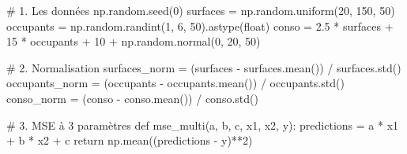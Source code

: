 \documentclass[
  french,
  11pt,
  a4paper,
]{scrbook}
\newenvironment{Shaded}{}{}
\newcommand{\BuiltInTok}[1]{\textcolor[rgb]{0.84,0.23,0.29}{#1}}
\newcommand{\CommentTok}[1]{\textcolor[rgb]{0.42,0.45,0.49}{#1}}
\newcommand{\ControlFlowTok}[1]{\textcolor[rgb]{0.84,0.23,0.29}{#1}}
\newcommand{\DecValTok}[1]{\textcolor[rgb]{0.00,0.36,0.77}{#1}}
\newcommand{\FloatTok}[1]{\textcolor[rgb]{0.00,0.36,0.77}{#1}}
\newcommand{\KeywordTok}[1]{\textcolor[rgb]{0.84,0.23,0.29}{#1}}
\newcommand{\NormalTok}[1]{\textcolor[rgb]{0.14,0.16,0.18}{#1}}
\newcommand{\OperatorTok}[1]{\textcolor[rgb]{0.14,0.16,0.18}{#1}}
\begin{document}
\begin{tcolorbox}[enhanced jigsaw, arc=.35mm, bottomrule=.15mm, bottomtitle=1mm, breakable, colback=white, colbacktitle=quarto-callout-tip-color!10!white, colframe=quarto-callout-tip-color-frame, coltitle=black, left=2mm, leftrule=.75mm, opacityback=0, opacitybacktitle=0.6, rightrule=.15mm, title=\textcolor{quarto-callout-tip-color}{\faLightbulb}\hspace{0.5em}{✅ Voir la correction}, titlerule=0mm, toprule=.15mm, toptitle=1mm]

\begin{Shaded}
\begin{Highlighting}[]
\CommentTok{\# 1. Les données}
\NormalTok{np.random.seed(}\DecValTok{0}\NormalTok{)}
\NormalTok{surfaces }\OperatorTok{=}\NormalTok{ np.random.uniform(}\DecValTok{20}\NormalTok{, }\DecValTok{150}\NormalTok{, }\DecValTok{50}\NormalTok{)}
\NormalTok{occupants }\OperatorTok{=}\NormalTok{ np.random.randint(}\DecValTok{1}\NormalTok{, }\DecValTok{6}\NormalTok{, }\DecValTok{50}\NormalTok{).astype(}\BuiltInTok{float}\NormalTok{)}
\NormalTok{conso }\OperatorTok{=} \FloatTok{2.5} \OperatorTok{*}\NormalTok{ surfaces }\OperatorTok{+} \DecValTok{15} \OperatorTok{*}\NormalTok{ occupants }\OperatorTok{+} \DecValTok{10} \OperatorTok{+}\NormalTok{ np.random.normal(}\DecValTok{0}\NormalTok{, }\DecValTok{20}\NormalTok{, }\DecValTok{50}\NormalTok{)}

\CommentTok{\# 2. Normalisation}
\NormalTok{surfaces\_norm }\OperatorTok{=}\NormalTok{ (surfaces }\OperatorTok{{-}}\NormalTok{ surfaces.mean()) }\OperatorTok{/}\NormalTok{ surfaces.std()}
\NormalTok{occupants\_norm }\OperatorTok{=}\NormalTok{ (occupants }\OperatorTok{{-}}\NormalTok{ occupants.mean()) }\OperatorTok{/}\NormalTok{ occupants.std()}
\NormalTok{conso\_norm }\OperatorTok{=}\NormalTok{ (conso }\OperatorTok{{-}}\NormalTok{ conso.mean()) }\OperatorTok{/}\NormalTok{ conso.std()}

\CommentTok{\# 3. MSE à 3 paramètres}
\KeywordTok{def}\NormalTok{ mse\_multi(a, b, c, x1, x2, y):}
\NormalTok{    predictions }\OperatorTok{=}\NormalTok{ a }\OperatorTok{*}\NormalTok{ x1 }\OperatorTok{+}\NormalTok{ b }\OperatorTok{*}\NormalTok{ x2 }\OperatorTok{+}\NormalTok{ c}
    \ControlFlowTok{return}\NormalTok{ np.mean((predictions }\OperatorTok{{-}}\NormalTok{ y)}\OperatorTok{**}\DecValTok{2}\NormalTok{)}


\end{Highlighting}
\end{Shaded}
\end{tcolorbox}
\end{document}
